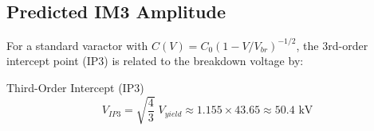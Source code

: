\subsection{Predicted IM3 Amplitude}

For a standard varactor with $C(V) = C_0 (1 - V/V_{br})^{-1/2}$, the 3rd-order intercept point (IP3) is related to the breakdown voltage by:
\begin{resultbox}{Third-Order Intercept (IP3)}
%
\begin{equation}
    V_{IP3} = \sqrt{\frac{4}{3}}\; V_{yield} \approx 1.155 \times 43.65 \approx 50.4 \text{ kV}
    \label{eq:ip3}
\end{equation}
\end{resultbox}

